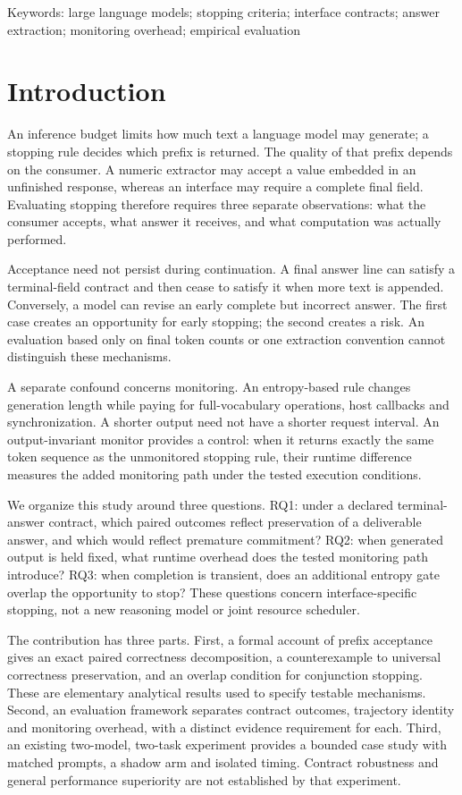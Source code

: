 \documentclass[12pt,a4paper]{article}
\begin{document}
Keywords: large language models; stopping criteria; interface contracts; answer extraction; monitoring overhead; empirical evaluation

\section{Introduction}
An inference budget limits how much text a language model may generate; a stopping rule decides which prefix is returned. The quality of that prefix depends on the consumer. A numeric extractor may accept a value embedded in an unfinished response, whereas an interface may require a complete final field. Evaluating stopping therefore requires three separate observations: what the consumer accepts, what answer it receives, and what computation was actually performed.

Acceptance need not persist during continuation. A final answer line can satisfy a terminal-field contract and then cease to satisfy it when more text is appended. Conversely, a model can revise an early complete but incorrect answer. The first case creates an opportunity for early stopping; the second creates a risk. An evaluation based only on final token counts or one extraction convention cannot distinguish these mechanisms.

A separate confound concerns monitoring. An entropy-based rule changes generation length while paying for full-vocabulary operations, host callbacks and synchronization. A shorter output need not have a shorter request interval. An output-invariant monitor provides a control: when it returns exactly the same token sequence as the unmonitored stopping rule, their runtime difference measures the added monitoring path under the tested execution conditions.

We organize this study around three questions. RQ1: under a declared terminal-answer contract, which paired outcomes reflect preservation of a deliverable answer, and which would reflect premature commitment? RQ2: when generated output is held fixed, what runtime overhead does the tested monitoring path introduce? RQ3: when completion is transient, does an additional entropy gate overlap the opportunity to stop? These questions concern interface-specific stopping, not a new reasoning model or joint resource scheduler.

The contribution has three parts. First, a formal account of prefix acceptance gives an exact paired correctness decomposition, a counterexample to universal correctness preservation, and an overlap condition for conjunction stopping. These are elementary analytical results used to specify testable mechanisms. Second, an evaluation framework separates contract outcomes, trajectory identity and monitoring overhead, with a distinct evidence requirement for each. Third, an existing two-model, two-task experiment provides a bounded case study with matched prompts, a shadow arm and isolated timing. Contract robustness and general performance superiority are not established by that experiment.
\end{document}
